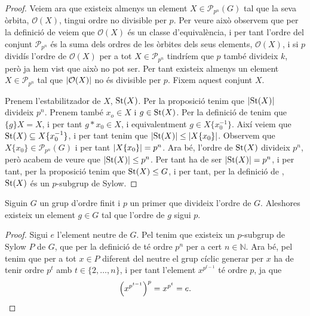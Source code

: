 \documentclass[../../Main.tex]{subfiles}
\begin{document}
\begin{theorem}
\begin{proof}
			Veiem ara que existeix almenys un element \(X\in\mathcal{P}_{p^{n}}(G)\) tal que la seva òrbita, \(\mathcal{O}(X)\), tingui ordre no divisible per \(p\). Per veure això observem que per la definició de  veiem que \(\mathcal{O}(X)\) és un classe d'equivalència, i per tant l'ordre del conjunt \(\mathcal{P}_{p^{n}}\) és la suma dels ordres de les òrbites dels seus elements, \(\mathcal{O}(X)\), i si \(p\) dividís l'ordre de \(\mathcal{O}(X)\) per a tot \(X\in\mathcal{P}_{p^{n}}\) tindríem que \(p\) també divideix \(k\), però ja hem vist que això no pot ser. Per tant existeix almenys un element \(X\in\mathcal{P}_{p^{n}}\) tal que \(\abs{\mathcal{O}(X)}\) no és divisible per \(p\). Fixem aquest conjunt \(X\).
			
			Prenem l'estabilitzador de \(X\), \(\operatorname{St}(X)\). Per la proposició  tenim que \(\abs{\St(X)}\) divideix \(p^{n}\). Prenem també \(x_{o}\in X\) i \(g\in\operatorname{St}(X)\). Per la definició de  tenim que \(\{g\}X=X\), i per tant \(g\ast x_{0}\in X\), i equivalentment \(g\in X\{x_{0}^{-1}\}\). Així veiem que \(\operatorname{St}(X)\subseteq X\{x_{0}^{-1}\}\), i per tant tenim que \(\abs{\St(X)}\leq\abs{X\{x_{0}\}}\). Observem que \(X\{x_{0}\}\in\mathcal{P}_{p^{n}}(G)\) i per tant \(\abs{X\{x_{0}\}}=p^{n}\). Ara bé, l'ordre de \(\operatorname{St}(X)\) divideix \(p^{n}\), però acabem de veure que \(\abs{\St(X)}\leq p^{n}\). Per tant ha de ser \(\abs{\St(X)}=p^{n}\), i per tant, per la proposició  tenim que \(\operatorname{St}(X)\leq G\), i per tant, per la definició de , \(\operatorname{St}(X)\) és un \(p\)-subgrup de Sylow.
		\end{proof}
	\end{theorem}
	\begin{corollary}
		\label{thm:Teorema de Cauchy per grups}
		Siguin \(G\) un grup d'ordre finit i \(p\) un primer que divideix l'ordre de \(G\). Aleshores existeix un element \(g\in G\) tal que l'ordre de \(g\) sigui \(p\).
		\begin{proof}
			Sigui \(e\) l'element neutre de \(G\). Pel  tenim que existeix un \(p\)-subgrup de Sylow \(P\) de \(G\), que per la definició de  té ordre \(p^{n}\) per a cert \(n\in\mathbb{N}\). Ara bé, pel  tenim que per a tot \(x\in P\) diferent del neutre el grup cíclic generar per \(x\) ha de tenir ordre \(p^{t}\) amb \(t\in\{2,\dots,n\}\), i per tant l'element \(x^{p^{t-1}}\) té ordre \(p\), ja que 
			\[\left(x^{p^{t-1}}\right)^{p}=x^{p^{t}}=e.\qedhere\]
		\end{proof}
	\end{corollary}
\end{document}
